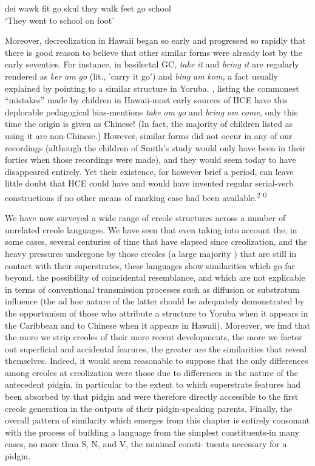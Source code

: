 \ea\label{ex:2:264}
 dei wawk fit go skul they walk feet go school\\
\glt `They went to school on foot'
\z



Moreover, decreolization in Hawaii began so early and progressed so rapidly that there is good reason to believe that other similar forms were already lost by the early seventies. For instance, in basilectal GC, \textit{take} \textit{it} and \textit{bring} \textit{it} are regularly rendered as \textit{ker} \textit{am} \textit{go }(lit., 'carry it go') and \textit{bi}\textit{n}\textit{g} \textit{am} \textit{k}\textit{om,} a fact usually explained by pointing to a similar structure in Yoruba. \citet{Smith1939}, listing the commonest ``mistakes''
made by children in Hawaii-most early sources of HCE have this deplorable pedagogical bias-mentions \textit{take} \textit{om} \textit{go} and \textit{bring} \textit{om} \textit{come,} only this time the origin is given as Chinese! (In fact, the majority of children listed as using it are non-Chinese.) However, similar forms did not occur in any of our recordings (although the children of Smith's study would only have been in their forties when those recordings were made), and they would seem today to have disappeared entirely. Yet their existence, for however brief a period, can leave little doubt that HCE could have and would have invented regular serial-verb constructions if no other means of marking case had been available.\textsuperscript{2} \textsuperscript{0}

We have now surveyed a wide range of creole structures across a number of unrelated creole languages. We have seen that even taking into account the, in some cases, several centuries of time that have elapsed since creolization, and the heavy pressures undergone by those creoles (a large majority ) that are still in contact with their superstrates, these languages show similarities which go far beyond. the possibility of coincidental resemblance, and which are not explicable in terms of conventional transmission processes such as diffusion or substratum influence (the ad hoe nature of the latter should be ade\-quately demonstrated by the opportunism of those who attribute a structure to Yoruba when it appears in the Caribbean and to Chinese when it appears in Hawaii). Moreover, we fmd that the more we strip creoles of their more recent developments, the more we factor out superficial and accidental fearures, the greater are the similarities that reveal themselves. Indeed, it would seem reasonable to suppose that the only differences among creoles at creolization were those due to differences in the nature of the antecedent pidgin, in particular to the extent to which superstrate features had been absorbed by that pidgin and were therefore directly accessible to the first creole generation in the outputs of their pidgin-speaking parents. Finally, the overall pattern of similarity which emerges from this chapter is entirely conso\-nant with the process of building a language from the simplest consti\-tuents-in many cases, no more than S, N, and V, the minimal consti{}- tuents necessary for a pidgin. 

